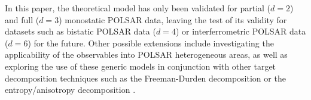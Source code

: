\documentclass[]{tRSL2e}
\begin{document}
In this paper, the theoretical model has only been validated for partial ($d=2$) and full ($d=3$) monostatic POLSAR data,
  leaving the test of its validity for datasets such as bistatic POLSAR data ($d=4$) or interferrometric POLSAR data ($d=6$) for the future.
Other possible extensions include
  investigating the applicability of the observables into POLSAR heterogeneous areas,
  as well as exploring the use of these generic models in conjunction with other target decomposition techniques
    such as the Freeman-Durden decomposition \citep{Freeman_1998_TGRS_963} or the entropy/anisotropy decomposition \citep{Cloude_1997_TGRS_68}.



\end{document}
